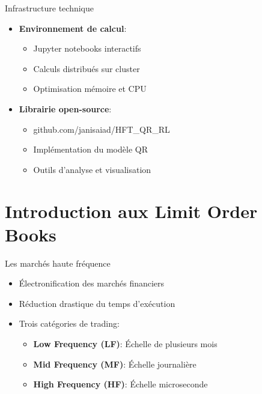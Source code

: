 \documentclass[aspectratio=169]{beamer}  %
\begin{document}
\begin{frame}{Infrastructure technique}
    \begin{itemize}
        \item \textbf{Environnement de calcul}:
        \begin{itemize}
            \item Jupyter notebooks interactifs
            \item Calculs distribués sur cluster
            \item Optimisation mémoire et CPU
        \end{itemize}
        \item \textbf{Librairie open-source}:
        \begin{itemize}
            \item github.com/janisaiad/HFT\_QR\_RL
            \item Implémentation du modèle QR
            \item Outils d'analyse et visualisation
        \end{itemize}
    \end{itemize}
\end{frame}

\section{Introduction aux Limit Order Books}

\begin{frame}{Les marchés haute fréquence}
    \begin{itemize}
        \item Électronification des marchés financiers
        \item Réduction drastique du temps d'exécution
        \item Trois catégories de trading:
        \begin{itemize}
            \item \textbf{Low Frequency (LF)}: Échelle de plusieurs mois
            \item \textbf{Mid Frequency (MF)}: Échelle journalière
            \item \textbf{High Frequency (HF)}: Échelle microseconde
        \end{itemize}
    \end{itemize}
\end{frame}
\end{document}
